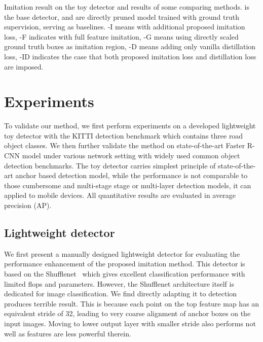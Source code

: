 \documentclass[10pt,twocolumn,letterpaper]{article}
\begin{document}
\begin{table*}[]
	\label{exp_toy_detector}
	\caption{Imitation result on the toy detector and results of some comparing methods.  is the base detector,  and  are directly pruned model trained with ground truth supervision, serving as baselines. -I means with additional proposed imitation loss, -F indicates with full feature imitation, -G means using directly scaled ground truth boxes as imitation region, -D means adding only vanilla distillation loss, -ID indicates the case that both proposed imitation loss and distillation loss are imposed.}
	\vspace{-3mm}
\end{table*}


\section{Experiments} \label{experiment_section}
To validate our method, we first perform experiments on a developed lightweight toy detector with the KITTI detection benchmark which contains three road object classes. We then further validate the method on state-of-the-art Faster R-CNN model under various network setting with widely used common object detection benchmarks. 
The toy detector carries simplest principle of state-of-the-art anchor based detection model, while the performance is not comparable to those cumbersome and multi-stage stage or multi-layer detection models, it can applied to mobile devices.
All quantitative results are evaluated in average precision (AP).



\subsection{Lightweight detector}
\label{sec_lightweight_detector}

We first present a manually designed lightweight detector for evaluating the performance enhancement of the proposed imitation method. This detector is based on the {Shufflenet}~\cite{shufflenet} which gives excellent classification performance with limited flops and parameters.  However, the Shufflenet architecture itself is dedicated for image classification. We find directly adapting it to detection produces terrible result. This is because each point on the top feature map has an equivalent stride of 32, leading to very coarse alignment of anchor boxes on the input images.  Moving to lower output layer with smaller stride also performs not well as features are less powerful therein. 
\end{document}
